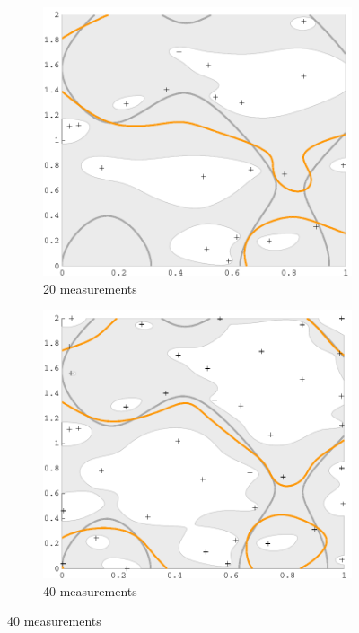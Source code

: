 \documentclass[11pt]{article} %
\begin{document}
\begin{figure}[tb]
  \begin{subfigure}[b]{0.5\textwidth}
    \centering
    \includegraphics[width=\textwidth]{figures/sin2d_20}
    \caption{20 measurements}
  \end{subfigure}
  \hfill
  \begin{subfigure}[b]{0.5\textwidth}
    \centering
    \includegraphics[width=\textwidth]{figures/sin2d_40}
    \caption{40 measurements}

\end{subfigure}
\end{figure}
\end{document}
